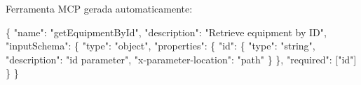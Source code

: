 \documentclass[
]{article}
\newenvironment{Shaded}{}{}
\newcommand{\AttributeTok}[1]{\textcolor[rgb]{0.49,0.56,0.16}{#1}}
\newcommand{\CharTok}[1]{\textcolor[rgb]{0.25,0.44,0.63}{#1}}
\newcommand{\DataTypeTok}[1]{\textcolor[rgb]{0.56,0.13,0.00}{#1}}
\newcommand{\FunctionTok}[1]{\textcolor[rgb]{0.02,0.16,0.49}{#1}}
\newcommand{\KeywordTok}[1]{\textcolor[rgb]{0.00,0.44,0.13}{\textbf{#1}}}
\newcommand{\OtherTok}[1]{\textcolor[rgb]{0.00,0.44,0.13}{#1}}
\newcommand{\StringTok}[1]{\textcolor[rgb]{0.25,0.44,0.63}{#1}}
\begin{document}
\begin{Shaded}
\end{Shaded}

Ferramenta MCP gerada automaticamente:

\begin{Shaded}
\begin{Highlighting}[]
\FunctionTok{\{}
  \DataTypeTok{"name"}\FunctionTok{:} \StringTok{"getEquipmentById"}\FunctionTok{,}
  \DataTypeTok{"description"}\FunctionTok{:} \StringTok{"Retrieve equipment by ID"}\FunctionTok{,}
  \DataTypeTok{"inputSchema"}\FunctionTok{:} \FunctionTok{\{}
    \DataTypeTok{"type"}\FunctionTok{:} \StringTok{"object"}\FunctionTok{,}
    \DataTypeTok{"properties"}\FunctionTok{:} \FunctionTok{\{}
      \DataTypeTok{"id"}\FunctionTok{:} \FunctionTok{\{}
        \DataTypeTok{"type"}\FunctionTok{:} \StringTok{"string"}\FunctionTok{,}
        \DataTypeTok{"description"}\FunctionTok{:} \StringTok{"id parameter"}\FunctionTok{,}
        \DataTypeTok{"x{-}parameter{-}location"}\FunctionTok{:} \StringTok{"path"}
      \FunctionTok{\}}
    \FunctionTok{\},}
    \DataTypeTok{"required"}\FunctionTok{:} \OtherTok{[}\StringTok{"id"}\OtherTok{]}
  \FunctionTok{\}}
\FunctionTok{\}}
\end{Highlighting}
\end{Shaded}
\end{document}
